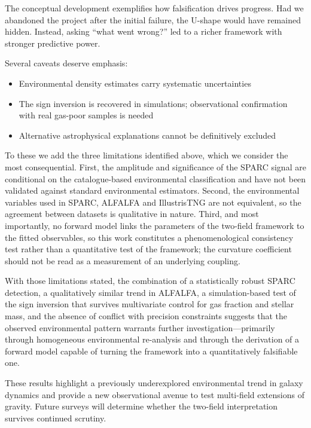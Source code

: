 \documentclass[11pt,a4paper]{article}
\begin{document}
The conceptual development exemplifies how falsification drives progress. Had we abandoned the project after the initial failure, the U-shape would have remained hidden. Instead, asking ``what went wrong?'' led to a richer framework with stronger predictive power.

Several caveats deserve emphasis:
\begin{itemize}
\item Environmental density estimates carry systematic uncertainties
\item The sign inversion is recovered in simulations; observational confirmation with real gas-poor samples is needed
\item Alternative astrophysical explanations cannot be definitively excluded
\end{itemize}

To these we add the three limitations identified above, which we consider the most consequential. First, the amplitude and significance of the SPARC signal are conditional on the catalogue-based environmental classification and have not been validated against standard environmental estimators. Second, the environmental variables used in SPARC, ALFALFA and IllustrisTNG are not equivalent, so the agreement between datasets is qualitative in nature. Third, and most importantly, no forward model links the parameters of the two-field framework to the fitted observables, so this work constitutes a phenomenological consistency test rather than a quantitative test of the framework; the curvature coefficient should not be read as a measurement of an underlying coupling.

With those limitations stated, the combination of a statistically robust SPARC detection, a qualitatively similar trend in ALFALFA, a simulation-based test of the sign inversion that survives multivariate control for gas fraction and stellar mass, and the absence of conflict with precision constraints suggests that the observed environmental pattern warrants further investigation---primarily through homogeneous environmental re-analysis and through the derivation of a forward model capable of turning the framework into a quantitatively falsifiable one.

These results highlight a previously underexplored environmental trend in galaxy dynamics and provide a new observational avenue to test multi-field extensions of gravity. Future surveys will determine whether the two-field interpretation survives continued scrutiny.

\end{document}
